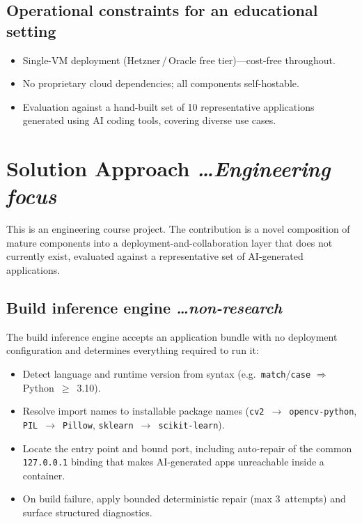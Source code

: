 \documentclass[11pt,a4paper]{article}
\newcommand{\BvrHint}[1]{%
{\normalfont\normalsize\itshape\hfill #1}}
\begin{document}
\subsection{Operational constraints for an educational setting}
\begin{itemize}[leftmargin=0.7cm]
  \item Single-VM deployment (Hetzner\,/\,Oracle free tier)---cost-free throughout.
  \item No proprietary cloud dependencies; all components self-hostable.
  \item Evaluation against a hand-built set of 10 representative applications generated
    using AI coding tools, covering diverse use cases.
\end{itemize}

\section{Solution Approach %
\BvrHint{\ldots Engineering focus}}

This is an engineering course project. The contribution is a novel composition of mature
components into a deployment-and-collaboration layer that does not currently exist,
evaluated against a representative set of AI-generated applications.

\subsection{Build inference engine %
\BvrHint{\ldots non-research}}

The build inference engine accepts an application bundle with no deployment configuration
and determines everything required to run it:

\begin{itemize}[leftmargin=0.7cm]
  \item Detect language and runtime version from syntax
    (e.g.\ \texttt{match}/\texttt{case} $\Rightarrow$ Python~$\geq$~3.10).
  \item Resolve import names to installable package names
    (\texttt{cv2}~$\to$~\texttt{opencv-python},
     \texttt{PIL}~$\to$~\texttt{Pillow},
     \texttt{sklearn}~$\to$~\texttt{scikit-learn}).
  \item Locate the entry point and bound port, including auto-repair of the common
    \texttt{127.0.0.1} binding that makes AI-generated apps unreachable inside a
    container.
  \item On build failure, apply bounded deterministic repair (max 3~attempts) and
    surface structured diagnostics.
\end{itemize}
\end{document}
